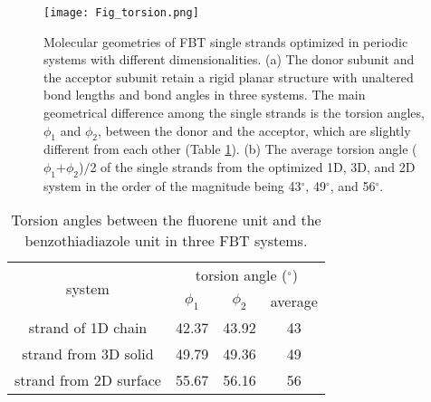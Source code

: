 \documentclass[journal = jpclcd]{achemso}
\begin{document}
\begin{figure}[H]
    \centering
    \texttt{[image: Fig\_torsion.png]}
    \caption{Molecular geometries of FBT single strands optimized in periodic systems with different dimensionalities. (a) The donor subunit and the acceptor subunit retain a rigid planar structure with unaltered bond lengths and bond angles in three systems. The main geometrical difference among the single strands is the torsion angles, $\phi_1$ and $\phi_2$, between the donor and the acceptor, which are slightly different from each other (Table \ref{tab:FBT_geometry_info}). (b) The average torsion angle ($\phi_1$$+$$\phi_2$)$/$2 of the single strands from the optimized 1D, 3D, and 2D system in the order of the magnitude being 43$^\circ$, 49$^\circ$, and 56$^\circ$.} 
    \label{Fig_torsion}
\end{figure}

\begin{table}[H]
\begin{tabular}{c|ccc}
\multirow{2}{*}{system} & \multicolumn{3}{c}{torsion angle ($^\circ$)}                                 \\ \cline{2-4} 
                        & \multicolumn{1}{c|}{$\phi_1$}  & \multicolumn{1}{c|}{$\phi_2$}  & average \\ \hline
strand of 1D chain      & \multicolumn{1}{c|}{42.37} & \multicolumn{1}{c|}{43.92} & 43      \\
strand from 3D solid    & \multicolumn{1}{c|}{49.79} & \multicolumn{1}{c|}{49.36} & 49      \\
strand from 2D surface  & \multicolumn{1}{c|}{55.67} & \multicolumn{1}{c|}{56.16} & 56     
\end{tabular}
\caption{Torsion angles between the fluorene unit and the benzothiadiazole unit in three FBT systems.}
\label{tab:FBT_geometry_info}
\end{table}
\end{document}
